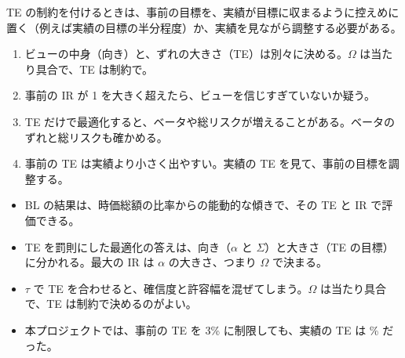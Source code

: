 TE の制約を付けるときは、事前の目標を、実績が目標に収まるように控えめに置く（例えば実績の目標の半分程度）か、実績を見ながら調整する必要がある。

\begin{tipbox}[コツ：TE と IR]
\begin{enumerate}
\item ビューの中身（向き）と、ずれの大きさ（TE）は別々に決める。$\Omega$ は当たり具合で、TE は制約で。
\item 事前の IR が 1 を大きく超えたら、ビューを信じすぎていないか疑う。
\item TE だけで最適化すると、ベータや総リスクが増えることがある。ベータのずれと総リスクも確かめる。
\item 事前の TE は実績より小さく出やすい。実績の TE を見て、事前の目標を調整する。
\end{enumerate}
\end{tipbox}

\begin{keybox}[この章のまとめ]
\begin{itemize}
\item BL の結果は、時価総額の比率からの能動的な傾きで、その TE と IR で評価できる。
\item TE を罰則にした最適化の答えは、向き（$\alpha$ と $\Sigma$）と大きさ（TE の目標）に分かれる。最大の IR は $\alpha$ の大きさ、つまり $\Omega$ で決まる。
\item $\tau$ で TE を合わせると、確信度と許容幅を混ぜてしまう。$\Omega$ は当たり具合で、TE は制約で決めるのがよい。
\item 本プロジェクトでは、事前の TE を 3\% に制限しても、実績の TE は \% だった。
\end{itemize}
\end{keybox}
